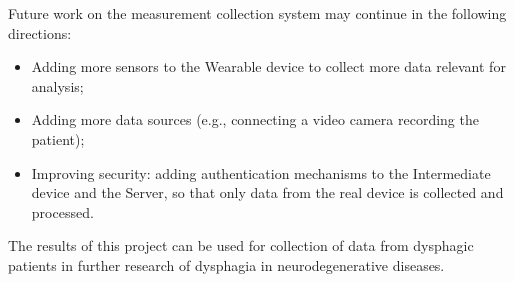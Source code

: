 \documentclass[lettersize,journal]{IEEEtran}
\begin{document}
Future work on the measurement collection system may continue in the following directions:
\begin{itemize}
    \item Adding more sensors to the Wearable device to collect more data relevant for analysis;
    \item Adding more data sources (e.g., connecting a video camera recording the patient);
    \item Improving security: adding authentication mechanisms to the Intermediate device and
          the Server, so that only data from the real device is collected and processed.
    \\
\end{itemize}

The results of this project can be used for collection of data from dysphagic patients in
further research of dysphagia in neurodegenerative diseases.



\FloatBarrier
\clearpage

%

\end{document}
